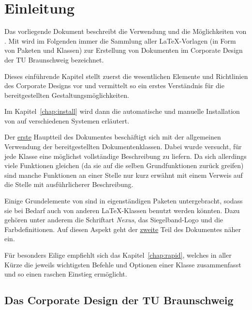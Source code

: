 \chapter{Einleitung}

Das vorliegende Dokument beschreibt die Verwendung und die Möglichkeiten von \tubslatex.
Mit \tubslatex wird im Folgenden immer die Sammlung aller \LaTeX-Vorlagen
(in Form von Paketen und Klassen) zur Erstellung von Dokumenten im
Corporate Design der TU Braunschweig bezeichnet.

Dieses einführende Kapitel stellt zuerst die wesentlichen Elemente und Richtlinien
des Corporate Designs vor und vermittelt so ein erstes Verständnis für
die bereitgestellten Gestaltungsmöglichkeiten.

Im Kapitel~\ref{chap:install} wird dann die automatische und manuelle
Installation von \tubslatex auf verschiedenen Systemen erläutert.

Der \hyperlink{part:user}{erste} Hauptteil des Dokumentes beschäftigt sich mit
der allgemeinen Verwendung der bereitgestellten Dokumentenklassen.
Dabei wurde versucht, für jede Klasse eine möglichst vollständige Beschreibung
zu liefern. Da sich allerdings viele Funktionen gleichen
(da sie auf die selben Grundfunktionen zurück greifen)
sind manche Funktionen an einer Stelle nur kurz erwähnt mit einem Verweis
auf die Stelle mit ausführlicherer Beschreibung.

Einige Grundelemente von \tubslatex sind in eigenständigen Paketen untergebracht,
sodass sie bei Bedarf auch von anderen \LaTeX-Klassen benutzt werden könnten.
Dazu gehören unter anderem die Schriftart \emph{Nexus}, das Siegelband-Logo
und die Farbdefinitionen.
Auf diesen Aspekt geht der \hyperlink{part:packages}{zweite}
Teil des Dokumentes näher ein.

Für besonders Eilige empfiehlt sich das Kapitel~\ref{chap:rapid},
welches in aller Kürze die jeweils wichtigsten Befehle und Optionen einer Klasse
zusammenfasst und so einen raschen Einstieg ermöglicht.

\clearpage
\section{Das Corporate Design der TU Braunschweig}

